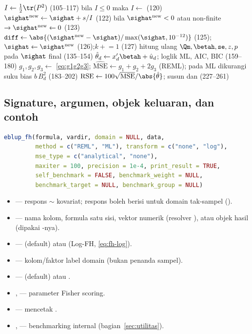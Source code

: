\begin{algorithm}[htbp]
{{    $I\leftarrow\tfrac12\tr(P^2)$ (105--117)}\;
  bila $I\le0$ maka $I\leftarrow$  (120)\;
  ${\sighat}{}^{\text{new}}\leftarrow\sighat+s/I$ (122)\;
  bila ${\sighat}{}^{\text{new}}<0$ atau non-finite $\to{\sighat}{}^{\text{new}}\leftarrow0$ (123)\;
  $\texttt{diff}\leftarrow\abs{({\sighat}{}^{\text{new}}-\sighat)/\max(\sighat,10^{-12})}$ (125);\quad
    $\sighat\leftarrow{\sighat}{}^{\text{new}}$ (126);\quad $k\mathrel{+}=1$ (127)\;
}
hitung ulang $\Qm,\betah,\texttt{se},z,p$ pada $\sighat$ final (135--154)\;
$\hat\theta_d\leftarrow x_d'\betah+\hat u_d$; loglik ML, AIC, BIC (159--180)\;
$g_1,g_2,g_3\leftarrow$ \eqref{eq:g1g2g3};
  $\widehat{\mathrm{MSE}}\leftarrow g_1+g_2+2g_3$ (REML);
  pada ML dikurangi suku bias $b\,B_d^2$ (183--202)\;
$\mathrm{RSE}\leftarrow100\sqrt{\mathrm{MSE}}/\abs{\hat\theta}$;
  susun  dan  (227--261)\;
\end{algorithm}

\subsection{Signature, argumen, objek keluaran, dan contoh}\label{sec:fh-api}

\begin{lstlisting}[language=R,caption={Signature \texttt{eblup\_fh} (\texttt{R/eblup\_fh.R:98-112}).}]
eblup_fh(formula, vardir, domain = NULL, data,
         method = c("REML", "ML"), transform = c("none", "log"),
         mse_type = c("analytical", "none"),
         maxiter = 100, precision = 1e-4, print_result = TRUE,
         self_benchmark = FALSE, benchmark_weight = NULL,
         benchmark_target = NULL, benchmark_group = NULL)
\end{lstlisting}

\begin{itemize}
  \item {} --- respons $\sim$ kovariat; respons boleh berisi
         untuk domain tak-sampel ().
  \item {} --- nama kolom, formula satu sisi, vektor numerik
        (resolver ), atau objek hasil
         (dipakai -nya).
  \item {} ---  (default) atau 
        (Log-FH, \eqref{eq:fh-log}).
  \item {} --- kolom/faktor label domain (bukan penanda sampel).
  \item {} ---  (default) atau .
  \item {},  --- parameter Fisher scoring.
  \item {} --- mencetak .
  \item {},  --- benchmarking internal
        (bagian~\ref{sec:utilitas}).
\end{itemize}

